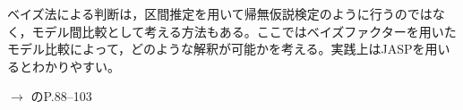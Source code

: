 \item[ベイズ法による判断]ベイズ法による判断は，区間推定を用いて帰無仮説検定のように行うのではなく，モデル間比較として考える方法もある。ここではベイズファクターを用いたモデル比較によって，どのような解釈が可能かを考える。実践上はJASPを用いるとわかりやすい。
\begin{flushright}
	$\to$ \textcite{Lee201709}のP.88--103
\end{flushright}
